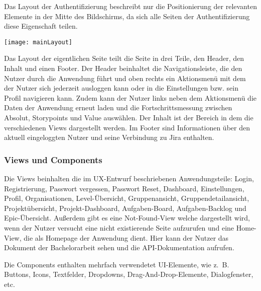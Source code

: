 Das Layout der Authentifizierung beschreibt nur die Positionierung der relevanten Elemente in der Mitte des Bildschirms, da sich alle Seiten der Authentifizierung diese Eigenschaft teilen.

\vspace{20pt}
\begin{center}
    \begin{minipage}{0.8\linewidth}
        \texttt{[image: mainLayout]}
    \end{minipage}
\end{center}
\vspace{20pt}

Das Layout der eigentlichen Seite teilt die Seite in drei Teile, den Header, den Inhalt und einen Footer. Der Header beinhaltet die Navigationsleiste, die den Nutzer durch die Anwendung führt und oben rechts ein Aktionsmenü mit dem der Nutzer sich jederzeit ausloggen kann oder in die Einstellungen bzw. sein Profil navigieren kann. Zudem kann der Nutzer links neben dem Aktionsmenü die Daten der Anwendung erneut laden und die Fortschrittsmessung zwischen Absolut, Storypoints und Value auswählen. Der Inhalt ist der Bereich in dem die verschiedenen Views dargestellt werden. Im Footer sind Informationen über den aktuell eingeloggten Nutzer und seine Verbindung zu Jira enthalten.

\subsubsection{Views und Components}
Die Views beinhalten die im UX-Entwurf beschriebenen Anwendungsteile: Login, Registrierung, Passwort vergessen, Passwort Reset, Dashboard, Einstellungen, Profil, Organisationen, Level-Übersicht, Gruppenansicht, Gruppendetailansicht, Projektübersicht, Projekt-Dashboard, Aufgaben-Board, Aufgaben-Backlog und Epic-Übersicht. Außerdem gibt es eine Not-Found-View welche dargestellt wird, wenn der Nutzer versucht eine nicht existierende Seite aufzurufen und eine Home-View, die als Homepage der Anwendung dient. Hier kann der Nutzer das Dokument der Bachelorarbeit sehen und die API-Dokumentation aufrufen.

Die Components enthalten mehrfach verwendetet UI-Elemente, wie z. B. Buttons, Icons, Textfelder, Dropdowns, Drag-And-Drop-Elemente, Dialogfenster, etc.


